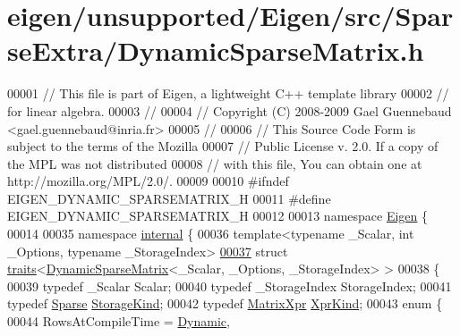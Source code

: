 \hypertarget{eigen_2unsupported_2_eigen_2src_2_sparse_extra_2_dynamic_sparse_matrix_8h_source}{}\section{eigen/unsupported/\+Eigen/src/\+Sparse\+Extra/\+Dynamic\+Sparse\+Matrix.h}
\label{eigen_2unsupported_2_eigen_2src_2_sparse_extra_2_dynamic_sparse_matrix_8h_source}

\begin{DoxyCode}
00001 \textcolor{comment}{// This file is part of Eigen, a lightweight C++ template library}
00002 \textcolor{comment}{// for linear algebra.}
00003 \textcolor{comment}{//}
00004 \textcolor{comment}{// Copyright (C) 2008-2009 Gael Guennebaud <gael.guennebaud@inria.fr>}
00005 \textcolor{comment}{//}
00006 \textcolor{comment}{// This Source Code Form is subject to the terms of the Mozilla}
00007 \textcolor{comment}{// Public License v. 2.0. If a copy of the MPL was not distributed}
00008 \textcolor{comment}{// with this file, You can obtain one at http://mozilla.org/MPL/2.0/.}
00009 
00010 \textcolor{preprocessor}{#ifndef EIGEN\_DYNAMIC\_SPARSEMATRIX\_H}
00011 \textcolor{preprocessor}{#define EIGEN\_DYNAMIC\_SPARSEMATRIX\_H}
00012 
00013 \textcolor{keyword}{namespace }\hyperlink{namespace_eigen}{Eigen} \{ 
00014 
00035 \textcolor{keyword}{namespace }\hyperlink{namespaceinternal}{internal} \{
00036 \textcolor{keyword}{template}<\textcolor{keyword}{typename} \_Scalar, \textcolor{keywordtype}{int} \_Options, \textcolor{keyword}{typename} \_StorageIndex>
\hyperlink{struct_eigen_1_1internal_1_1traits_3_01_dynamic_sparse_matrix_3_01___scalar_00_01___options_00_01___storage_index_01_4_01_4}{00037} \textcolor{keyword}{struct }\hyperlink{struct_eigen_1_1internal_1_1traits}{traits}<\hyperlink{class_eigen_1_1_dynamic_sparse_matrix}{DynamicSparseMatrix}<\_Scalar, \_Options, \_StorageIndex> >
00038 \{
00039   \textcolor{keyword}{typedef} \_Scalar Scalar;
00040   \textcolor{keyword}{typedef} \_StorageIndex StorageIndex;
00041   \textcolor{keyword}{typedef} \hyperlink{struct_eigen_1_1_sparse}{Sparse} \hyperlink{struct_eigen_1_1_sparse}{StorageKind};
00042   \textcolor{keyword}{typedef} \hyperlink{struct_eigen_1_1_matrix_xpr}{MatrixXpr} \hyperlink{struct_eigen_1_1_matrix_xpr}{XprKind};
00043   \textcolor{keyword}{enum} \{
00044     RowsAtCompileTime = \hyperlink{namespace_eigen_ad81fa7195215a0ce30017dfac309f0b2}{Dynamic},

\end{DoxyCode}
